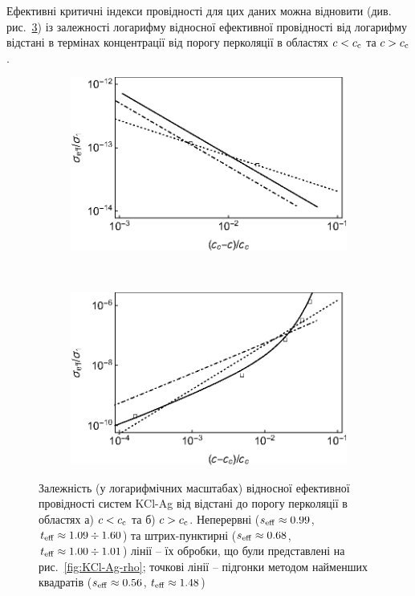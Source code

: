 \documentclass[14pt,twoside]{vakthesis}
\begin{document}
Ефективні критичні індекси провідності для цих даних можна відновити (див. рис.~\ref{fig:KCl-Ag-rho-loglog}) із залежності логарифму відносної ефективної провідності від логарифму відстані в термінах концентрації від порогу перколяції в областях $c<c_{\rm c}$ та $c > c_{\rm c}$. 
\begin{figure}[tb]
	\centering
	\begin{subfigure}[c]{0.49\textwidth}
		\includegraphics[width=\textwidth]{chen-grannan-s2-loglogs.eps}
		\caption{} \label{fig:KCl-Ag-rho-logloga}
	\end{subfigure}%
	~
	\begin{subfigure}[c]{0.49\textwidth}
		\includegraphics[width=\textwidth]{chen-grannan-s2-loglogt.eps}
		\caption{} \label{fig:KCl-Ag-rho-loglogb}
	\end{subfigure}
	\caption{\label{fig:KCl-Ag-rho-loglog} Залежність (у логарифмічних масштабах) відносної ефективної провідності систем KCl-Ag \cite{ChenI.-G.1986} від відстані до порогу перколяції в областях а) $c < c_{\rm c}$ та б) $c > c_{\rm c}$. Неперервні ($s_{\rm eff} \approx 0.99$, $t_{\rm eff} \approx 1.09 \div 1.60$) та штрих-пунктирні ($s_{\rm eff} \approx 0.68$, $t_{\rm eff} \approx 1.00 \div 1.01$) лінії -- їх обробки, що були представлені на рис.~\ref{fig:KCl-Ag-rho}; точкові лінії -- підгонки методом найменших квадратів ($s_{\rm eff} \approx 0.56$, $t_{\rm eff} \approx 1.48$)}
\end{figure}
\end{document}
